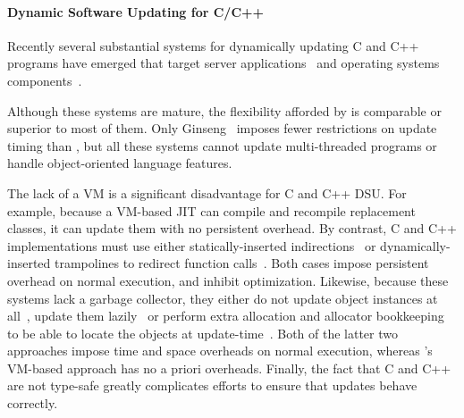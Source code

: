 
\paragraph{Dynamic Software Updating for C/C++}

Recently several substantial systems for dynamically updating C and
C++ programs have emerged that target server
applications~\cite{HjalmtyssonG98,altekar05opus,neamtiu06dsu,chen:icse07}
and operating systems
components~\cite{K42reconfig,k42usenix,chen06vee,lee06linuxmod,dynamos_eurosys_07}.

Although these systems are mature, the flexibility
afforded by \DSU{} is comparable or superior to most of them.
Only Ginseng~\cite{neamtiu06dsu} imposes fewer restrictions
on update timing than \DSU, but all these systems
cannot update multi-threaded programs or handle object-oriented language
features.

The lack of a VM is a significant disadvantage %
for C and C++ DSU.  For example, because a VM-based \acs{JIT} can compile
and recompile replacement classes, it can update them with no
persistent overhead.  By contrast, C and C++ implementations must use
either statically-inserted
indirections~\cite{HjalmtyssonG98,neamtiu06dsu,K42reconfig,k42usenix}
or dynamically-inserted trampolines to redirect function
calls~\cite{altekar05opus,chen06vee,chen:icse07,Ksplice}.  Both cases impose
persistent overhead on normal execution, %
and inhibit optimization.  Likewise, because these systems lack a garbage
collector, they either do not update object instances at
all~\cite{Ksplice}, update them
lazily~\cite{neamtiu06dsu,chen:icse07} or perform extra allocation and
allocator bookkeeping to be able to locate the objects at
update-time~\cite{k42usenix}.  Both of the latter two approaches impose time and space
overheads on normal execution, whereas \DSU{}'s VM-based approach has
no a priori overheads.  Finally, the fact that C and C++ are not
type-safe greatly complicates efforts to ensure that updates behave
correctly.



